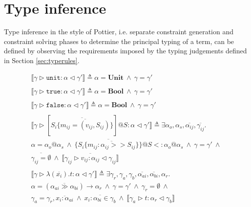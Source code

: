 \documentclass{article}
\newcommand{\inferrule}[4]{\llbracket #1 \triangleright #2 : #3 \triangleleft #4 \rrbracket}
\newcommand{\inferlhs}[1]{\llbracket \gamma \triangleright #1 : \alpha \triangleleft \gamma' \rrbracket}
\newcommand{\unitv}{\mathtt{unit}}
\newcommand{\unitt}{\mathbf{Unit}}
\newcommand{\truev}{\mathtt{true}}
\newcommand{\falsev}{\mathtt{false}}
\newcommand{\boolt}{\mathbf{Bool}}
\newcommand{\cand}{\:\wedge\:}
\begin{document}
\section{Type inference}

Type inference in the style of Pottier, i.e. separate constraint generation
and constraint solving phases to determine the principal typing of a term,
can be defined by observing the requirements imposed by the typing judgements
defined in Section \ref{sec:typerules}.

\ottgrammartabular{
\ottC\ottinterrule
\ottctxc\ottinterrule
\otttyc\ottinterrule
\ottprotoc\ottinterrule
}

\[
\begin{array}{l}

\inferlhs{\unitv} \triangleq \alpha = \unitt \cand \gamma = \gamma' 
\\\\

\inferlhs{\truev} \triangleq \alpha = \boolt \cand \gamma = \gamma' 
\\\\

\inferlhs{\falsev} \triangleq \alpha = \boolt \cand \gamma = \gamma' 
\\\\

\inferlhs{[ \overline{S_i \{ \overline{ m_{ij} = (v_{ij}, S_{ij}) } \} }]@S}
\triangleq
\exists \alpha_o, \alpha_s, \overline{\alpha_{ij}}, \overline{\gamma_{ij}} . \\
\alpha = \alpha_o@\alpha_s
\cand
\{ \overline{ S_i \{ \overline{ m_{ij} : \alpha_{ij} >> S_{ij} } \} }\}@S <: \alpha_o@\alpha_s
\cand
\gamma = \gamma'
\cand
\\
\overline{\gamma_{ij} = \emptyset}
\cand
\overline{\inferrule{\gamma_{ij}}{v_{ij}}{\alpha_{ij}}{\gamma_{ij}}}
\\\\

\inferlhs{\lambda ( \overline{x_i} ) . t} \triangleq
\exists \gamma_r, \gamma_a, \gamma_b, \overline{\alpha_{ai}}, \overline{\alpha_{bi}}, \alpha_r . \\
\alpha = (\overline{\alpha_{ai} \gg \alpha_{bi}}) \rightarrow \alpha_r
\cand
\gamma = \gamma'
\cand
\gamma_r = \emptyset
\cand \\
\gamma_a = \gamma_r, \overline{x_i : \alpha_{ai}}
\cand
\overline{x_i : \alpha_{bi} \in \gamma_b}
\cand
\inferrule{\gamma_a}{t}{\alpha_r}{\gamma_b} 
\\\\


\end{array}\]
\end{document}
